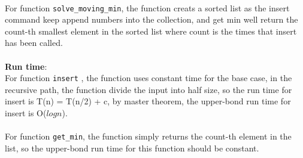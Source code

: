 \documentclass{assignment-263}
\begin{document}
\\
For function \verb|solve_moving_min|, the function creats a sorted list as the insert command keep append numbers into the collection, and get min well return the count-th smallest element in the sorted list where count is the times that insert has been called.\\
\\
\textbf{Run time}:\\
For function \verb|insert| , the function uses constant time for the base case, in the recursive path, the function divide the input into half size, so the run time for insert is T(n) = T(n/2) + c, by master theorem, the upper-bond run time for insert is O($logn$).\\
\\
For function \verb|get_min|, the function simply returns the count-th element in the list, so the upper-bond run time for this function should be constant.
\end{document}
